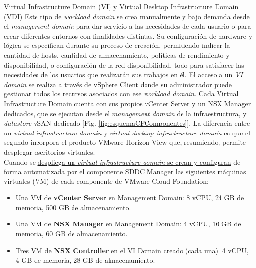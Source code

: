 \begin{subsubsection}{Virtual Infrastructure Domain (VI) y Virtual Desktop Infrastructure Domain (VDI)}
\label{subsubsec:domainVI}
Este tipo de \textit{workload domain} se crea manualmente y bajo demanda desde el \textit{management domain} para dar servicio a las necesidades de cada usuario o para crear diferentes entornos con finalidades distintas. Su configuración de hardware y lógica se especifican durante su proceso de creación, permitiendo indicar la cantidad de hosts, cantidad de almacenamiento, políticas de rendimiento y disponibilidad, o configuración de la red disponibilidad, todo para satisfacer las necesidades de los usuarios que realizarán sus trabajos en él. El acceso a un \textit{VI domain} se realiza a través de vSphere Client donde su administrador puede gestionar todos los recursos asociados con ese \textit{workload domain}. Cada Virtual Infrastructure Domain cuenta con sus propios vCenter Server y un NSX Manager dedicados, que se ejecutan desde el \textit{management domain} de la infraestructura, y \textit{datastore} vSAN dedicado [Fig. \ref{fig:esquemaCFComponentes}]. La diferencia entre un \textit{virtual infrastructure domain} y \textit{virtual desktop infrastructure domain} es que el segundo incorpora el producto VMware Horizon View que, resumiendo, permite desplegar escritorios virtuales.\\
Cuando se \underline{despliega un \textit{virtual infrastructure domain} se crean y configuran} de forma automatizada por el componente SDDC Manager las siguientes máquinas virtuales (VM) de cada componente de VMware Cloud Foundation:
\begin{itemize}
    \item Una VM de \textbf{vCenter Server} en Management Domain: 8 vCPU, 24 GB de memoria, 500 GB de almacenamiento.
    \item Una VM de \textbf{NSX Manager} en Management Domain: 4 vCPU, 16 GB de memoria, 60 GB de almacenamiento.
    \item Tres VM de \textbf{NSX Controller} en el VI Domain creado (cada una):  4 vCPU, 4 GB de memoria, 28 GB de almacenamiento.
\end{itemize}

\end{subsubsection}
